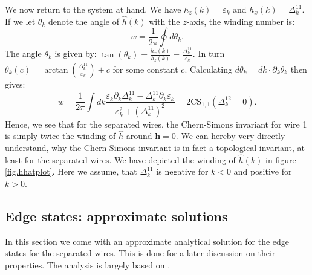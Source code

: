 We now return to the system at hand. We have $h_z(k) = \varepsilon_k$ and $h_x(k) = \Delta^{11}_k$. If we let $\theta_k$ denote the angle of $\hat{h}(k)$ with the $z$-axis, the winding number is:
\begin{equation}
w = \frac{1}{2\pi}\oint d\theta_k.
\label{eq.definition.windingnumber}
\end{equation} 
The angle $\theta_k$ is given by: $\tan(\theta_k) = \frac{h_x(k)}{h_z(k)} = \frac{\Delta^{11}_k}{\varepsilon_k}$. In turn $\theta_k(c) = \arctan\left(\frac{\Delta^{11}_k}{\varepsilon_k}\right) + c$ for some constant $c$. Calculating $d\theta_k = dk \cdot \partial_k \theta_k$ then gives:
\begin{equation}
w = \frac{1}{2\pi}\int dk \frac{\varepsilon_k\partial_k\Delta^{11}_k - \Delta^{11}_k\partial_k\varepsilon_k}{\varepsilon^2_k + (\Delta^{11}_k)^2} = 2\text{CS}_{1,1}(\Delta^{12}_k = 0). \nonumber
\end{equation} 
Hence, we see that for the separated wires, the Chern-Simons invariant for wire 1 is simply twice the winding of $\hat{h}$ around $\mathbf{h} = 0$. We can hereby very directly understand, why the Chern-Simons invariant is in fact a topological invariant, at least for the separated wires. We have depicted the winding of $\hat{h}(k)$ in figure \ref{fig.hhatplot}. Here we assume, that $\Delta^{11}_k$ is negative for $k < 0$ and positive for $k > 0$. 

\subsection{Edge states: approximate solutions}
\label{subsec.2wiresedgestates}
In this section we come with an approximate analytical solution for the edge states for the separated wires. This is done for a later discussion on their properties. The analysis is largely based on \cite[pp. 196-198]{BernevigTITSC}. 

